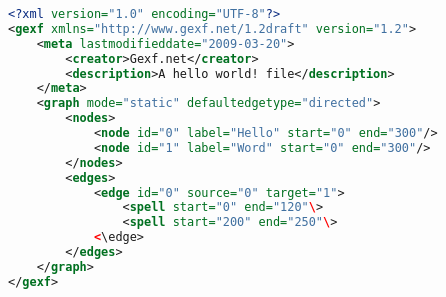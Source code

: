 \begin{lstlisting}[caption=Example of a graph in GEXF file
format,label=lst:gephiFormat, language=XML] 
<?xml version="1.0" encoding="UTF-8"?>
<gexf xmlns="http://www.gexf.net/1.2draft" version="1.2">
    <meta lastmodifieddate="2009-03-20">
        <creator>Gexf.net</creator>
        <description>A hello world! file</description>
    </meta>
    <graph mode="static" defaultedgetype="directed">
        <nodes>
            <node id="0" label="Hello" start="0" end="300"/>
            <node id="1" label="Word" start="0" end="300"/>
        </nodes>
        <edges>
            <edge id="0" source="0" target="1">
            	<spell start="0" end="120"\>
            	<spell start="200" end="250"\>
            <\edge>
        </edges>
    </graph>
</gexf>
\end{lstlisting}
